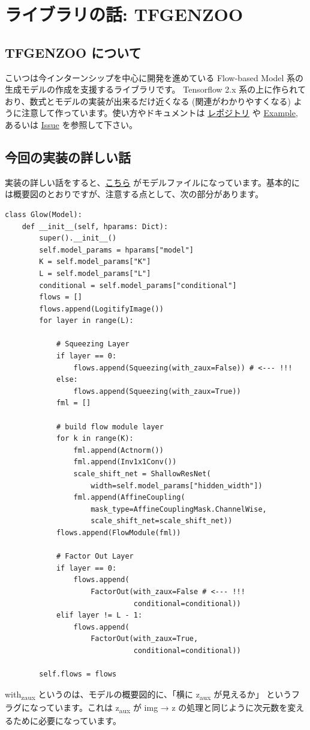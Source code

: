 \documentclass[dvipdfmx]{article}
\begin{document}
\section{ライブラリの話: TFGENZOO}
\label{sec:org8fec0a0}
\subsection{TFGENZOO について}
\label{sec:orge87a042}
こいつは今インターンシップを中心に開発を進めている Flow-based Model 系の生成モデルの作成を支援するライブラリです。 Tensorflow 2.x 系の上に作られており、数式とモデルの実装が出来るだけ近くなる (関連がわかりやすくなる) ように注意して作っています。使い方やドキュメントは \href{https://github.com/MokkeMeguru/TFGENZO}{レポジトリ} や \href{https://github.com/MokkeMeguru/TFGENZOO\_EXAMPLE}{Example}, あるいは \href{https://github.com/MokkeMeguru/TFGENZOO/issues/new}{Issue} を参照して下さい。\\
\subsection{今回の実装の詳しい話}
\label{sec:org5237c70}
実装の詳しい話をすると、\href{https://github.com/MokkeMeguru/TFGENZOO\_EXAMPLE/blob/c63288de6ab64002c5986c1d6dadbd1bb0f83df0/models/glow.py}{こちら} がモデルファイルになっています。基本的には概要図のとおりですが、注意する点として、次の部分があります。\\

\begin{verbatim}
class Glow(Model):
    def __init__(self, hparams: Dict):
        super().__init__()
        self.model_params = hparams["model"]
        K = self.model_params["K"]
        L = self.model_params["L"]
        conditional = self.model_params["conditional"]
        flows = []
        flows.append(LogitifyImage())
        for layer in range(L):

            # Squeezing Layer
            if layer == 0:
                flows.append(Squeezing(with_zaux=False)) # <--- !!!
            else:
                flows.append(Squeezing(with_zaux=True))
            fml = []

            # build flow module layer
            for k in range(K):
                fml.append(Actnorm())
                fml.append(Inv1x1Conv())
                scale_shift_net = ShallowResNet(
                    width=self.model_params["hidden_width"])
                fml.append(AffineCoupling(
                    mask_type=AffineCouplingMask.ChannelWise,
                    scale_shift_net=scale_shift_net))
            flows.append(FlowModule(fml))

            # Factor Out Layer
            if layer == 0:
                flows.append(
                    FactorOut(with_zaux=False # <--- !!!
                              conditional=conditional))
            elif layer != L - 1:
                flows.append(
                    FactorOut(with_zaux=True,
                              conditional=conditional))

        self.flows = flows
\end{verbatim}

with\textsubscript{zaux} というのは、モデルの概要図的に、「横に z\textsubscript{aux} が見えるか」 というフラグになっています。これは z\textsubscript{aux} が img → z の処理と同じように次元数を変えるために必要になっています。\\
\end{document}
